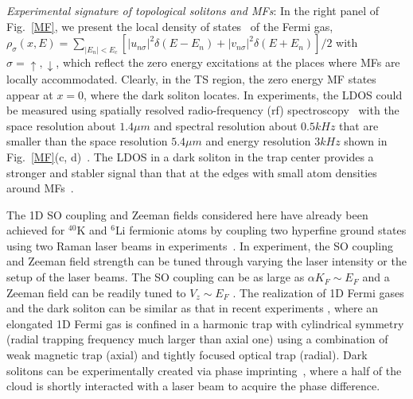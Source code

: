 \documentclass[prl,aps,twocolumn,showpacs, floatfix]{revtex4}
\begin{document}
\emph{Experimental signature of topological solitons and MFs}: In the right
panel of Fig.~\ref{MF}, we present the local density of states~\cite%
{HuHui2007PRA} of the Fermi gas, $\rho _{\sigma }(x,E)=\sum_{|E_{n}|<E_{c}}%
\left[ |u_{n\sigma }|^{2}\delta (E-E_{n})+|v_{n\sigma }|^{2}\delta (E+E_{n})%
\right] /2$ with $\sigma =\uparrow ,\downarrow $, which reflect the zero
energy excitations at the places where MFs are locally accommodated.
Clearly, in the TS region, the zero energy MF states appear at $x=0$, where
the dark soliton locates. In experiments, the LDOS could be measured using
spatially resolved radio-frequency (rf) spectroscopy~\cite{Shin2007PRL} with
the space resolution about $1.4\mu m$ and spectral resolution about $0.5kHz$
that are smaller than the space resolution $5.4\mu m$ and energy resolution $%
3kHz$ shown in Fig.~\ref{MF}(c, d)~\cite{Hulet2010Nature}. The LDOS in a
dark soliton in the trap center provides a stronger and stabler signal than
that at the edges with small atom densities around MFs~\cite{XJLiu2012PRA}.

The 1D SO coupling and Zeeman fields considered here have already been
achieved for $^{40}$K and $^{6}$Li fermionic atoms by coupling two hyperfine
ground states using two Raman laser beams in experiments~\cite%
{Jing2012PRL,Zwierlen2012PRL,Spilman2013PRL}. In experiment, the SO coupling
and Zeeman field strength can be tuned through varying the laser intensity
or the setup of the laser beams. The SO coupling can be as large as $\alpha
K_{F}\sim E_{F}$ and a Zeeman field can be readily tuned to $V_{z}\sim E_{F}$%
. The realization of 1D Fermi gases and the dark soliton can be similar as
that in recent experiments \cite{Martin2013Nature}, where an elongated 1D
Fermi gas is confined in a harmonic trap with cylindrical symmetry (radial
trapping frequency much larger than axial one) using a combination of weak
magnetic trap (axial) and tightly focused optical trap (radial). Dark
solitons can be experimentally created via phase imprinting~\cite%
{Burger1999PRL,Denschlag2000Science,Martin2013Nature}, where a half of the
cloud is shortly interacted with a laser beam to acquire the phase
difference.
\end{document}
